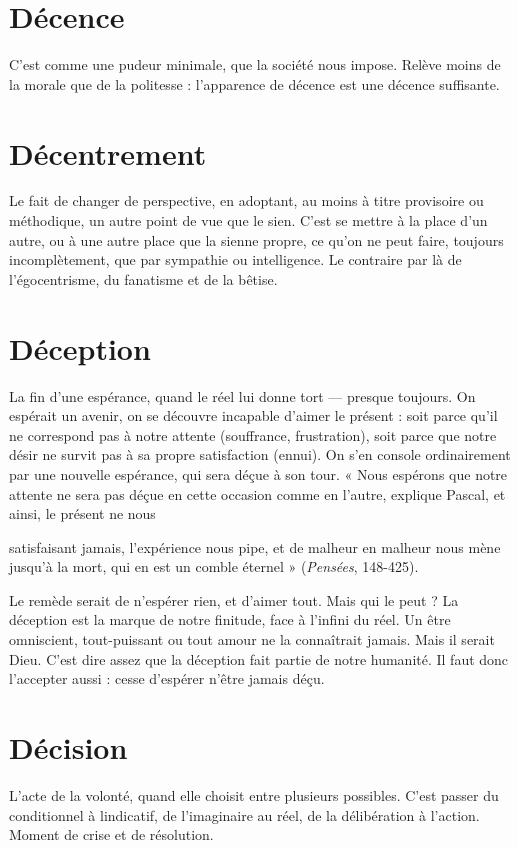 \section{Décence}
C’est comme une pudeur minimale, que la société nous impose.
Relève moins de la morale que de la politesse : l'apparence de
décence est une décence suffisante.

\section{Décentrement}
Le fait de changer de perspective, en adoptant, au moins
à titre provisoire ou méthodique, un autre point de vue
que le sien. C’est se mettre à la place d’un autre, ou à une autre place que la
sienne propre, ce qu’on ne peut faire, toujours incomplètement, que par sympathie
ou intelligence. Le contraire par là de l’égocentrisme, du fanatisme et de
la bêtise.

\section{Déception}
La fin d’une espérance, quand le réel lui donne tort — presque
toujours. On espérait un avenir, on se découvre incapable
d’aimer le présent : soit parce qu’il ne correspond pas à notre attente (souffrance,
frustration), soit parce que notre désir ne survit pas à sa propre satisfaction
(ennui). On s’en console ordinairement par une nouvelle espérance, qui
sera déçue à son tour. « Nous espérons que notre attente ne sera pas déçue en
cette occasion comme en l’autre, explique Pascal, et ainsi, le présent ne nous

satisfaisant jamais, l'expérience nous pipe, et de malheur en malheur nous
mène jusqu’à la mort, qui en est un comble éternel » ({\it Pensées}, 148-425).

Le remède serait de n’espérer rien, et d’aimer tout. Mais qui le peut ? La
déception est la marque de notre finitude, face à l'infini du réel. Un être omniscient,
tout-puissant ou tout amour ne la connaîtrait jamais. Mais il serait
Dieu. C’est dire assez que la déception fait partie de notre humanité. Il faut
donc l’accepter aussi : cesse d’espérer n’être jamais déçu.

\section{Décision}
L’acte de la volonté, quand elle choisit entre plusieurs possibles.
C’est passer du conditionnel à lindicatif, de l’imaginaire au
réel, de la délibération à l’action. Moment de crise et de résolution.


